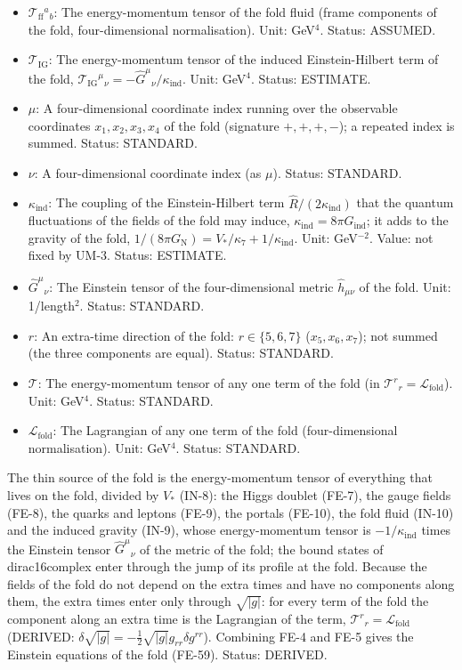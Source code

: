 \documentclass[
  10pt,
]{article}
\begin{document}
\begin{itemize}
\item
  \(\mathcal{T}_{\mathrm{ff}}{}^a{}_b\): The energy-momentum tensor of
  the fold fluid (frame components of the fold, four-dimensional
  normalisation). Unit: GeV\(^4\). Status: ASSUMED.
\item
  \(\mathcal{T}_{\mathrm{IG}}\): The energy-momentum tensor of the
  induced Einstein-Hilbert term of the fold,
  \(\mathcal{T}_{\mathrm{IG}}{}^\mu{}_\nu = -\hat G^\mu{}_\nu/\kappa_{\mathrm{ind}}\).
  Unit: GeV\(^4\). Status: ESTIMATE.
\item
  \(\mu\): A four-dimensional coordinate index running over the
  observable coordinates \(x_1, x_2, x_3, x_4\) of the fold (signature
  \(+,+,+,-\)); a repeated index is summed. Status: STANDARD.
\item
  \(\nu\): A four-dimensional coordinate index (as \(\mu\)). Status:
  STANDARD.
\item
  \(\kappa_{\mathrm{ind}}\): The coupling of the Einstein-Hilbert term
  \(\hat R/(2\kappa_{\mathrm{ind}})\) that the quantum fluctuations of
  the fields of the fold may induce,
  \(\kappa_{\mathrm{ind}} = 8\pi G_{\mathrm{ind}}\); it adds to the
  gravity of the fold,
  \(1/(8\pi G_{\mathrm{N}}) = V_*/\kappa_7 + 1/\kappa_{\mathrm{ind}}\).
  Unit: GeV\(^{-2}\). Value: not fixed by UM-3. Status: ESTIMATE.
\item
  \(\hat G^\mu{}_\nu\): The Einstein tensor of the four-dimensional
  metric \(\hat h_{\mu\nu}\) of the fold. Unit: 1/length\(^2\). Status:
  STANDARD.
\item
  \(r\): An extra-time direction of the fold: \(r \in \{5, 6, 7\}\)
  (\(x_5, x_6, x_7\)); not summed (the three components are equal).
  Status: STANDARD.
\item
  \(\mathcal{T}\): The energy-momentum tensor of any one term of the
  fold (in \(\mathcal{T}^r{}_r = \mathcal{L}_{\mathrm{fold}}\)). Unit:
  GeV\(^4\). Status: STANDARD.
\item
  \(\mathcal{L}_{\mathrm{fold}}\): The Lagrangian of any one term of the
  fold (four-dimensional normalisation). Unit: GeV\(^4\). Status:
  STANDARD.
\end{itemize}

The thin source of the fold is the energy-momentum tensor of everything
that lives on the fold, divided by \(V_*\) (IN-8): the Higgs doublet
(FE-7), the gauge fields (FE-8), the quarks and leptons (FE-9), the
portals (FE-10), the fold fluid (IN-10) and the induced gravity (IN-9),
whose energy-momentum tensor is \(-1/\kappa_{\mathrm{ind}}\) times the
Einstein tensor \(\hat G^\mu{}_\nu\) of the metric of the fold; the
bound states of dirac16complex enter through the jump of its profile at
the fold. Because the fields of the fold do not depend on the extra
times and have no components along them, the extra times enter only
through \(\sqrt{\lvert g\rvert}\): for every term of the fold the
component along an extra time is the Lagrangian of the term,
\(\mathcal{T}^r{}_r = \mathcal{L}_{\mathrm{fold}}\) (DERIVED:
\(\delta\sqrt{\lvert g\rvert} = -\frac12\sqrt{\lvert g\rvert}g_{rr}\delta g^{rr}\)).
Combining FE-4 and FE-5 gives the Einstein equations of the fold
(FE-59). Status: DERIVED.
\end{document}
